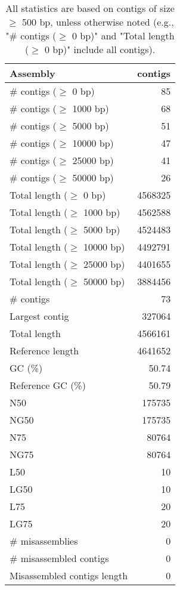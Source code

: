 \documentclass[12pt,a4paper]{article}
\begin{document}
\begin{table}[ht]
\begin{center}
\caption{All statistics are based on contigs of size $\geq$ 500 bp, unless otherwise noted (e.g., "\# contigs ($\geq$ 0 bp)" and "Total length ($\geq$ 0 bp)" include all contigs).}
\begin{tabular}{|l*{1}{|r}|}
\hline
Assembly & contigs \\ \hline
\# contigs ($\geq$ 0 bp) & 85 \\ \hline
\# contigs ($\geq$ 1000 bp) & 68 \\ \hline
\# contigs ($\geq$ 5000 bp) & 51 \\ \hline
\# contigs ($\geq$ 10000 bp) & 47 \\ \hline
\# contigs ($\geq$ 25000 bp) & 41 \\ \hline
\# contigs ($\geq$ 50000 bp) & 26 \\ \hline
Total length ($\geq$ 0 bp) & 4568325 \\ \hline
Total length ($\geq$ 1000 bp) & 4562588 \\ \hline
Total length ($\geq$ 5000 bp) & 4524483 \\ \hline
Total length ($\geq$ 10000 bp) & 4492791 \\ \hline
Total length ($\geq$ 25000 bp) & 4401655 \\ \hline
Total length ($\geq$ 50000 bp) & 3884456 \\ \hline
\# contigs & 73 \\ \hline
Largest contig & 327064 \\ \hline
Total length & 4566161 \\ \hline
Reference length & 4641652 \\ \hline
GC (\%) & 50.74 \\ \hline
Reference GC (\%) & 50.79 \\ \hline
N50 & 175735 \\ \hline
NG50 & 175735 \\ \hline
N75 & 80764 \\ \hline
NG75 & 80764 \\ \hline
L50 & 10 \\ \hline
LG50 & 10 \\ \hline
L75 & 20 \\ \hline
LG75 & 20 \\ \hline
\# misassemblies & 0 \\ \hline
\# misassembled contigs & 0 \\ \hline
Misassembled contigs length & 0 \\ \hline

\end{tabular}
\end{center}
\end{table}
\end{document}
